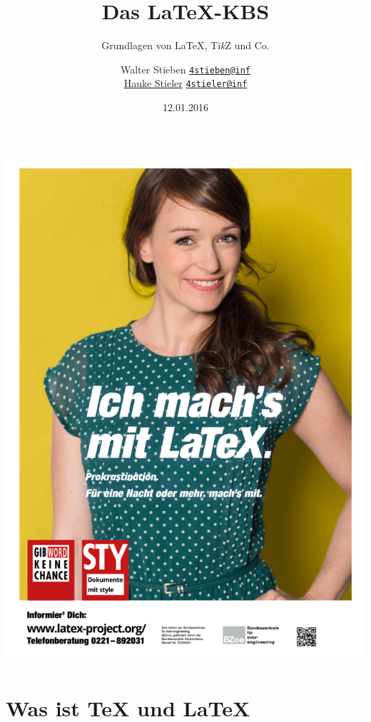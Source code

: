 \documentclass{beamer}
\title{Das \LaTeX-KBS}
\subtitle{\small Grundlagen von \LaTeX, Ti\textit{k}Z und Co.}
\author
{
	Walter Stieben \texttt{\href{mailto:4stieben@informatik.uni-hamburg.de}{4stieben@inf}}\\
	\href{http://hauke-stieler.de/}{Hauke Stieler} \texttt{\href{mailto:4stieler@informatik.uni-hamburg.de}{4stieler@inf}}
}
\date{\footnotesize 12.01.2016}
\begin{document}
	\maketitle
	\begin{frame}
		\begin{minipage}[t][0.5\textheight]{0.5\textwidth}
			\vspace{0pt} 
			\tableofcontents
		\end{minipage}
		\begin{minipage}[t]{0.45\textwidth} 
			\vspace{0pt}  
			\includegraphics[width=\textwidth]{./images/gib-word-keine-chance}
		\end{minipage}
	\end{frame}
	\section{Was ist \TeX{} und \LaTeX{}}
\end{document}
